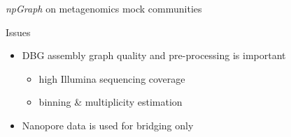 \documentclass{beamer}
\begin{document}
\begin{frame}{\emph{npGraph} on metagenomics mock communities}
\end{frame}
\begin{frame}{Issues}
\begin{itemize}
\item DBG assembly graph quality and pre-processing is important 
	\begin{itemize}
		\item high Illumina sequencing coverage
		\item binning \& multiplicity estimation
	\end{itemize}
\item Nanopore data is used for bridging only
\end{itemize}
\end{frame}
{
\begin{frame}[plain]
\end{frame}
}
\end{document}
